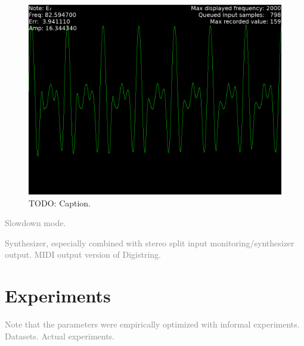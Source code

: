 \documentclass[a4paper,10pt,twocolumn]{article}
\begin{document}
\begin{figure}[h]
        \includegraphics[width=\linewidth]{fig/digi_wave.png}
    \caption{TODO: Caption.}
    \label{fig:screens}
\end{figure}

\textcolor{gray}{Slowdown mode.}

\textcolor{gray}{Synthesizer, especially combined with stereo split input monitoring/synthesizer output. MIDI output version of Digistring.}






\section{Experiments}  \label{sec:exp}
\textcolor{gray}{Note that the parameters were empirically optimized with informal experiments. Datasets. Actual experiments.}
\end{document}
